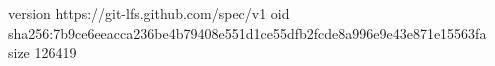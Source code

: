 version https://git-lfs.github.com/spec/v1
oid sha256:7b9ce6eeacca236be4b79408e551d1ce55dfb2fcde8a996e9e43e871e15563fa
size 126419

